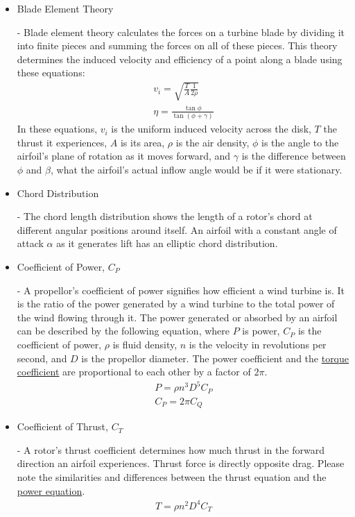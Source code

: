 \documentclass{article}
\begin{document}
\begin{itemize}
	\item \hypertarget{BET}{Blade Element Theory} - Blade element theory calculates the forces on a turbine blade by dividing it into finite pieces and summing the forces on all of these pieces. This theory determines the induced velocity and efficiency of a point along a blade using these equations:
	\begin{equation}
	\begin{aligned}
		v_{i} = \sqrt{\frac{T}{A} \frac{1}{2 \rho}} \\
        		\eta = \frac{\tan{\phi}}{\tan{(\phi + \gamma)}}
	\end{aligned}
	\end{equation}
In these equations, $v_{i}$ is the uniform induced velocity across the disk, $T$ the thrust it experiences, $A$ is its area, $\rho$ is the air density, $\phi$ is the angle to the airfoil's plane of rotation as it moves forward, and $\gamma$ is the difference between $\phi$ and $\beta$, what the airfoil's actual inflow angle would be if it were stationary.

	\item \hypertarget{c}{Chord Distribution} - The chord length distribution shows the length of a rotor's chord at different angular positions around itself. An airfoil with a constant angle of attack $\alpha$ as it generates lift has an elliptic chord distribution.
	
	\item \hypertarget{CP}{Coefficient of Power, $C_{P}$} - A propellor's coefficient of power signifies how efficient a wind turbine is. It is the ratio of the power generated by a wind turbine to the total power of the wind flowing through it. The power generated or absorbed by an airfoil can be described by the following equation, where $P$ is power, $C_{P}$ is the coefficient of power, $\rho$ is fluid density, $n$ is the velocity in revolutions per second, and $D$ is the propellor diameter. The power coefficient and the \hyperlink{CT}{torque coefficient} are proportional to each other by a factor of $2\pi$.
	\begin{equation}
	\begin{aligned}
		P = \rho n^{3} D^{5} C_{P} \\
		C_{P} = 2 \pi C_{Q}
	\end{aligned}
	\end{equation}
	
	\item \hypertarget{CT}{Coefficient of Thrust, $C_{T}$} - A rotor's thrust coefficient determines how much thrust in the forward direction an airfoil experiences. Thrust force is directly opposite drag. Please note the similarities and differences between the thrust equation and the \hyperlink{CP}{power equation}.
	\begin{equation}
	\begin{aligned}
		T = \rho n^{2} D^{4} C_{T}
	\end{aligned}
	\end{equation}
	

\end{itemize}
\end{document}
